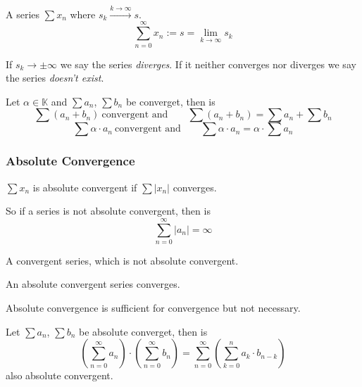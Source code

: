 \begin{definition}\label{def:series_convergence}
   A series \(\sum x_n\) where \(s_k \xrightarrow{k \to \infty} s\).
   \[\sum_{n = 0}^{\infty} x_n := s = \lim_{k \to \infty} s_k\]
\end{definition}
\begin{remark}
   If \(s_k \to \pm\infty\) we say the series \emph{diverges}.
   If it neither converges nor diverges we say the series \emph{doesn't exist}.
\end{remark}

\begin{proposition}\label{pro:series_calc_rules}
   Let \(\alpha \in \mathbb{K}\) and \(\sum a_n\), \(\sum b_n\) be converget, then is
   \[\sum (a_n + b_n)~\text{convergent and} \qquad \sum (a_n + b_n) = \sum a_n + \sum b_n\]
   \[\sum \alpha \cdot a_n~\text{convergent and} \qquad \sum \alpha \cdot a_n = \alpha \cdot \sum a_n\]
\end{proposition}

\subsubsection{Absolute Convergence}
\begin{definition}
   \(\sum x_n\) is absolute convergent if \(\sum |x_n|\) converges.
\end{definition}
\begin{remark}
   So if a series is not absolute convergent, then is
   \[\sum_{n=0}^\infty |a_n| = \infty\]
\end{remark}

\begin{definition}
   A convergent series, which is not absolute convergent.
\end{definition}

\begin{theorem}
   An absolute convergent series converges.
\end{theorem}
\begin{remark}
   Absolute convergence is sufficient for convergence but not necessary.
\end{remark}

\begin{theorem}
   Let \(\sum a_n\), \(\sum b_n\) be absolute converget, then is
   \[\left(\sum_{n=0}^\infty a_n\right) \cdot \left(\sum_{n=0}^\infty b_n\right) = \sum_{n=0}^\infty\left(\sum_{k=0}^n a_k \cdot b_{n - k}\right)\]
   also absolute convergent.
\end{theorem}

